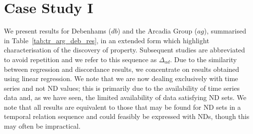 \section{Case Study I}\label{sec:tr_case1}

We present results for Debenhams ($db$) and the Arcadia Group ($ag$),
summarised in Table~\ref{tab:tr_arg_deb_res}, in an extended form
which highlight characterisation of the discovery of
property. Subsequent studies are abbreviated to avoid repetition and
we refer to this sequence as $\Delta_{ad}$. Due to the similarity
between regression and discordance results, we concentrate on results
obtained using linear regression. We note that we are now dealing
exclusively with time series and not ND values; this is primarily due
to the availability of time series data and, as we have seen, the
limited availability of data satisfying ND sets. We note that all
results are equivalent to those that may be found for ND sets in a
temporal relation sequence and could feasibly be expressed with NDs,
though this may often be impractical. 


